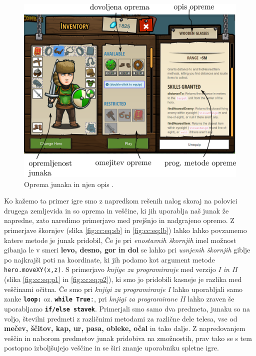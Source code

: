 \begin{figure}[h!]
  \centering
    \includegraphics [width=0.55\linewidth, keepaspectratio =
   1] {./images/sc_web/cc_izbor-zem-EQ-v01.png}
   \caption{Oprema junaka in njen opis \cite{web:codecombat}.}
   \label{fig:web:cc:zemljevid:EQ}
 \end{figure}
 
 Ko kažemo ta primer igre smo z napredkom rešenih nalog skoraj na
 polovici drugega zemljevida in so oprema in veščine, ki jih uporablja
 naš junak že napredne, zato naredimo primerjavo med prejšnjo in
 nadgrajeno opremo. Z primerjave škornjev (slika \ref{fig:cc:eq:sb} in
 \ref{fig:cc:eq:lb}) lahko lahko povzamemo katere metode je junak
 pridobil, Če je pri \emph{enostavnih škornjih} imel možnost gibanja
 le v smeri \textbf{levo, desno, gor in dol} se lahko pri
 \emph{usnjenih škornjih} giblje po najkrajši poti na koordinate, ki
 jih podamo kot argument metode \texttt{hero.moveXY(x,z)}. S
 primerjavo \emph{knjige za programiranje} med verzijo \emph{I in II}
 (slika \ref{fig:cc:eq:p1} in \ref{fig:cc:eq:p2}), ki smo jo pridobili
 kasneje je razlika med veščinami očitna. Če smo pri \emph{knjigi za
   programiranje I} lahko uporabljali samo zanke
 \texttt{\textbf{loop:}} oz. \texttt{\textbf{while True}:}, pri
 \emph{knjigi za programirane II} lahko zraven še uporabljamo
 \texttt{\textbf{if/else stavek}}. Primerjali smo samo dva predmeta,
 junaku so na voljo, številni predmeti z različnimi metodami za
 različne dele telesa, vse od \textbf{mečev, ščitov, kap, ur, pasa,
   obleke, očal} in tako dalje. Z napredovanjem veščin in naborom
 predmetov junak pridobiva na zmožnostih, prav tako se s tem postopno
 izboljšujejo veščine in se širi znanje uporabniku spletne igre.


